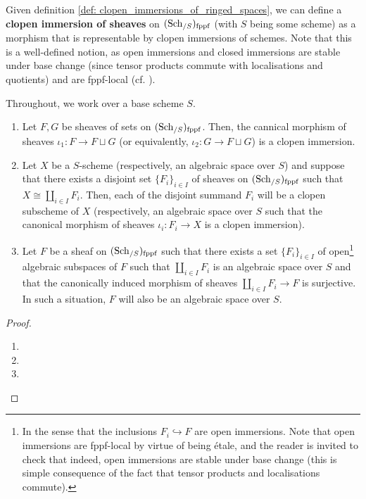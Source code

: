             \begin{remark} \label{remark: clopen_immersions_of_fppf_sheaves}
                Given definition \ref{def: clopen_immersions_of_ringed_spaces}, we can define a \textbf{clopen immersion of sheaves} on $(\mathrm{Sch}_{/S})_{\mathrm{fppf}}$ (with $S$ being some scheme) as a morphism that is representable by clopen immersions of schemes. Note that this is a well-defined notion, as open immersions and closed immersions are stable under base change (since tensor products commute with localisations and quotients) and are fppf-local (cf. \cite[\href{https://stacks.math.columbia.edu/tag/01JY}{Tag 01JY}]{stacks-project}).
            \end{remark}
            \begin{lemma} \label{lemma: representability_by_schemes_and_algebraic_spaces_of_disjoint_summands}
                Throughout, we work over a base scheme $S$.
                \begin{enumerate}
                    \item Let $F, G$ be sheaves of sets on $(\mathrm{Sch}_{/S})_{\mathrm{fppf}}$. Then, the cannical morphism of sheaves $\iota_1: F \to F \sqcup G$ (or equivalently, $\iota_2: G \to F \sqcup G$) is a clopen immersion.
                    \item Let $X$ be a $S$-scheme (respectively, an algebraic space over $S$) and suppose that there exists a disjoint set $\{F_i\}_{i \in I}$ of sheaves on $(\mathrm{Sch}_{/S})_{\mathrm{fppf}}$ such that $X \cong \coprod_{i \in I} F_i$. Then, each of the disjoint summand $F_i$ will be a clopen subscheme of $X$ (respectively, an algebraic space over $S$ such that the canonical morphism of sheaves $\iota_i: F_i \to X$ is a clopen immersion).
                    \item Let $F$ be a sheaf on $(\mathrm{Sch}_{/S})_{\mathrm{fppf}}$ such that there exists a set $\{F_i\}_{i \in I}$ of open\footnote{In the sense that the inclusions $F_i \hookrightarrow F$ are open immersions. Note that open immersions are fppf-local by virtue of being \'etale, and the reader is invited to check that indeed, open immersions are stable under base change (this is simple consequence of the fact that tensor products and localisations commute).} algebraic subspaces of $F$ such that $\coprod_{i \in I} F_i$ is an algebraic space over $S$ and that the canonically induced morphism of sheaves $\coprod_{i \in I} F_i \to F$ is surjective. In such a situation, $F$ will also be an algebraic space over $S$.
                \end{enumerate}
            \end{lemma}
                \begin{proof}
                    \noindent
                    \begin{enumerate}
                        \item 
                        \item 
                        \item 
                    \end{enumerate}
                \end{proof}
                
